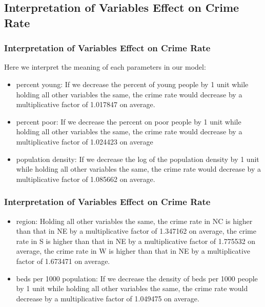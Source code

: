 \documentclass{beamer}
\begin{document}
\subsection{Interpretation of Variables Effect on Crime Rate}
\begin{frame}[fragile]
\frametitle{Interpretation of Variables Effect on Crime Rate}
Here we interpret the meaning of each parameters in our model:\\
\begin{itemize}
\item percent young:
If we decrease the percent of young people by 1 unit while holding all other variables the same, the crime rate would decrease by a multiplicative factor of 1.017847 on average.\\
\item percent poor: If we decrease the percent on poor people by 1 unit while holding all other variables the same, the crime rate would decrease by a multiplicative factor of 1.024423 on average\\
\item population density: If we decrease the log of the population density by 1 unit while holding all other variables the same, the crime rate would decrease by a multiplicative factor of 1.085662 on average.\\
\end{itemize}
\end{frame}



\begin{frame}[fragile]
\frametitle{Interpretation of Variables Effect on Crime Rate}
\begin{itemize}
\item region: Holding all other variables the same, the crime rate in NC is higher than that in NE by a multiplicative factor of 1.347162 on average, the crime rate in S is higher than that in NE by a multiplicative factor of 1.775532 on average, the crime rate in W is higher than that in NE by a multiplicative factor of 1.673471 on average.\\
\item beds per 1000 population: If we decrease the density of beds per 1000 people by 1 unit while holding all other variables the same, the crime rate would decrease by a multiplicative factor of 1.049475 on average.
\end{itemize}
\end{frame}
\end{document}
